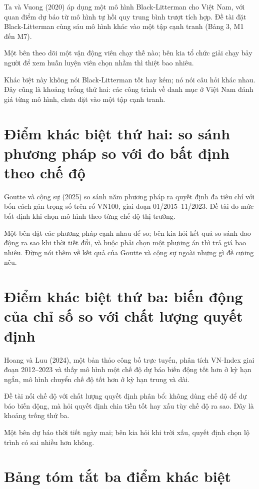 Ta và Vuong (2020) áp dụng một mô hình Black-Litterman cho Việt Nam, với quan điểm dự báo từ mô hình tự hồi quy trung bình trượt tích hợp. Đề tài đặt Black-Litterman cùng sáu mô hình khác vào một tập cạnh tranh (Bảng 3, M1 đến M7).

Một bên theo dõi một vận động viên chạy thế nào; bên kia tổ chức giải chạy bảy người để xem huấn luyện viên chọn nhầm thì thiệt bao nhiêu.

Khác biệt này không nói Black-Litterman tốt hay kém; nó nói câu hỏi khác nhau. Đây cũng là khoảng trống thứ hai: các công trình về danh mục ở Việt Nam đánh giá từng mô hình, chưa đặt vào một tập cạnh tranh.

\section{Điểm khác biệt thứ hai: so sánh phương pháp so với đo bất định theo chế độ}

Goutte và cộng sự (2025) so sánh năm phương pháp ra quyết định đa tiêu chí với bốn cách gán trọng số trên rổ VN100, giai đoạn 01/2015--11/2023. Đề tài đo mức bất định khi chọn mô hình theo từng chế độ thị trường.

Một bên đặt các phương pháp cạnh nhau để so; bên kia hỏi kết quả so sánh dao động ra sao khi thời tiết đổi, và buộc phải chọn một phương án thì trả giá bao nhiêu. Đừng nói thêm về kết quả của Goutte và cộng sự ngoài những gì đề cương nêu.

\section{Điểm khác biệt thứ ba: biến động của chỉ số so với chất lượng quyết định}

Hoang và Luu (2024), một bản thảo công bố trực tuyến, phân tích VN-Index giai đoạn 2012--2023 và thấy mô hình một chế độ dự báo biến động tốt hơn ở kỳ hạn ngắn, mô hình chuyển chế độ tốt hơn ở kỳ hạn trung và dài.

Đề tài nối chế độ với chất lượng quyết định phân bổ: không dùng chế độ để dự báo biến động, mà hỏi quyết định chia tiền tốt hay xấu tùy chế độ ra sao. Đây là khoảng trống thứ ba.

Một bên dự báo thời tiết ngày mai; bên kia hỏi khi trời xấu, quyết định chọn lộ trình có sai nhiều hơn không.

\section{Bảng tóm tắt ba điểm khác biệt}

